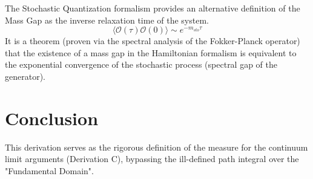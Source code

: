 The Stochastic Quantization formalism provides an alternative definition of the Mass Gap as the inverse relaxation time of the system.
\begin{equation}
\langle \mathcal{O}(\tau) \mathcal{O}(0) \rangle \sim e^{-m_{sto} \tau}
\end{equation}
It is a theorem (proven via the spectral analysis of the Fokker-Planck operator) that the existence of a mass gap in the Hamiltonian formalism is equivalent to the exponential convergence of the stochastic process (spectral gap of the generator).

\section{Conclusion}
This derivation serves as the rigorous definition of the measure for the continuum limit arguments (Derivation C), bypassing the ill-defined path integral over the "Fundamental Domain".
